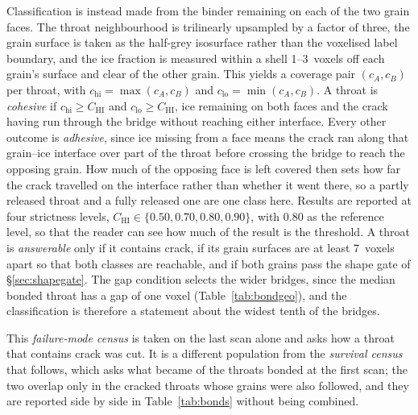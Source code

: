 \documentclass[preprint,12pt,numbers]{elsarticle}
\begin{document}
  Classification is instead made from the binder remaining on each of the two
  grain faces.  The throat neighbourhood is trilinearly upsampled by a factor of
  three, the grain surface is taken as the half-grey isosurface rather than the
  voxelised label boundary, and the ice fraction is measured within a shell
  1--3~voxels off each grain's surface and clear of the other grain.  This
  yields a coverage pair $(c_A,c_B)$ per throat, with
  $c_\mathrm{hi} = \max(c_A,c_B)$ and $c_\mathrm{lo} = \min(c_A,c_B)$.  A
  throat is \emph{cohesive} if $c_\mathrm{hi}\geq C_\mathrm{HI}$ and
  $c_\mathrm{lo}\geq C_\mathrm{HI}$, ice remaining on both faces and the crack
  having run through the bridge without reaching either interface.  Every other
  outcome is \emph{adhesive}, since ice missing from a face means the crack ran
  along that grain--ice interface over part of the throat before crossing the
  bridge to reach the opposing grain.  How much of the opposing face is left
  covered then sets how far the crack travelled on the interface rather than
  whether it went there, so a partly released throat and a fully released one
  are one class here.  Results are reported at four strictness levels,
  $C_\mathrm{HI} \in \{0.50,0.70,0.80,0.90\}$, with $0.80$ as the reference
  level, so that the reader can see how much of the result is the threshold.
  A throat is \emph{answerable} only if it contains crack, if its grain
  surfaces are at least 7~voxels apart so that both classes are reachable, and
  if both grains pass the shape gate of \S\ref{sec:shapegate}.  The gap
  condition selects the wider bridges, since the median bonded throat has a
  gap of one voxel (Table~\ref{tab:bondgeo}), and the classification is
  therefore a statement about the widest tenth of the bridges.

  This \emph{failure-mode census} is taken on the last scan alone and asks how
  a throat that contains crack was cut.  It is a different population from the
  \emph{survival census} that follows, which asks what became of the throats
  bonded at the first scan; the two overlap only in the cracked throats whose
  grains were also followed, and they are reported side by side in
  Table~\ref{tab:bonds} without being combined.
\end{document}
